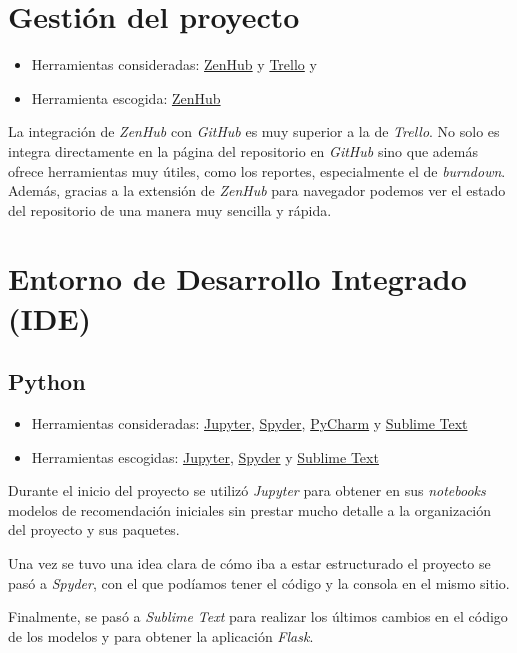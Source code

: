 \section{Gestión del proyecto}\label{gestion-del-proyecto}
\begin{itemize}
\tightlist
\item Herramientas consideradas: 
	\href{https://www.zenhub.com/}{ZenHub} y 
	\href{https://trello.com/}{Trello} y
\item Herramienta escogida:
	\href{https://www.zenhub.com/}{ZenHub}
\end{itemize}
La integración de \textit{ZenHub} con \textit{GitHub} es muy superior a la de \textit{Trello}. No solo es integra directamente en la página del repositorio en \textit{GitHub} sino que además ofrece herramientas muy útiles, como los reportes, especialmente el de \textit{burndown}. Además, gracias a la extensión de \textit{ZenHub} para navegador podemos ver el estado del repositorio de una manera muy sencilla y rápida.

\section{Entorno de Desarrollo Integrado (IDE)}\label{ide}
\subsection{Python}\label{python}
\begin{itemize}
\tightlist
\item Herramientas consideradas: 
	\href{https://jupyter.org/}{Jupyter}, 
	\href{https://www.spyder-ide.org/}{Spyder}, 
	\href{https://www.jetbrains.com/pycharm/}{PyCharm} y
	\href{https://www.sublimetext.com/}{Sublime Text}
\item Herramientas escogidas:
	\href{https://jupyter.org/}{Jupyter},
	\href{https://www.spyder-ide.org/}{Spyder} y 
	\href{https://www.sublimetext.com/}{Sublime Text}
\end{itemize}
Durante el inicio del proyecto se utilizó \textit{Jupyter} para obtener en sus \textit{notebooks} modelos de recomendación iniciales sin prestar mucho detalle a la organización del proyecto y sus paquetes.

Una vez se tuvo una idea clara de cómo iba a estar estructurado el proyecto se pasó a \textit{Spyder}, con el que podíamos tener el código y la consola en el mismo sitio.

Finalmente, se pasó a \textit{Sublime Text} para realizar los últimos cambios en el código de los modelos y para obtener la aplicación \textit{Flask}.

